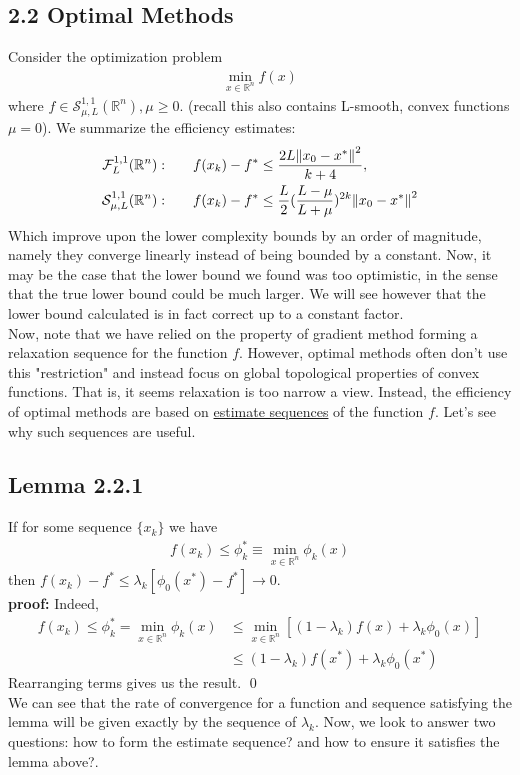 \documentclass[12pt,a4paper]{article}
\begin{document}
	 \subsection*{2.2 Optimal Methods}\label{sec22}
	 Consider the optimization problem
	 \begin{align*}
	 	\min_{x \in \mathbb{R}^n}f(x)
	 \end{align*}
	 where $f \in \mathcal{S}_{\mu, L}^{1,1}(\mathbb{R}^n), \mu \geq 0$. (recall this also contains L-smooth, convex functions $\mu=0$). We summarize the efficiency estimates:
	 \begin{align*}
	 	\mathcal{F}_L^{1,1}(\mathbb{R}^n): \hspace{20pt} &f(x_k) - f^* \leq \frac{2L\norm{x_0 - x^*}^2}{k+4}, \\
	 	\mathcal{S}_{\mu, L}^{1,1}(\mathbb{R}^n): \hspace{20pt} &f(x_k) - f^* \leq \frac{L}{2}(\frac{L-\mu}{L+\mu})^{2k}\norm{x_0 - x^*}^2
	 \end{align*}
	 Which improve upon the lower complexity bounds by an order of magnitude, namely they converge linearly instead of being bounded by a constant. Now, it may be the case that the lower bound we found was too optimistic, in the sense that the true lower bound could be much larger. We will see however that the lower bound calculated is in fact correct up to a constant factor. \\
	 Now, note that we have relied on the property of gradient method forming a relaxation sequence for the function $f$. However, optimal methods often don't use this "restriction" and instead focus on global topological properties of convex functions. That is, it seems relaxation is too narrow a view. Instead, the efficiency of optimal methods are based on \hyperref[sec:Def]{estimate sequences} of the function $f$. Let's see why such sequences are useful.
	 \subsection*{Lemma 2.2.1}\label{lem221}
	 If for some sequence $\{x_k\}$ we have
	 \begin{align*}
	 	f(x_k) \leq \phi_k^* \equiv \min_{x \in \mathbb{R}^n}\phi_k(x)
	 \end{align*}
	 then $f(x_k) - f^* \leq \lambda_k[\phi_0(x^*) - f^*] \rightarrow 0$. \\
	 \textbf{proof:} Indeed,
	 \begin{align*}
	 	f(x_k) \leq \phi_k^* = \min_{x \in \mathbb{R}^n}\phi_k(x) &\leq \min_{x \in \mathbb{R}^n}[(1 - \lambda_k)f(x) + \lambda_k\phi_0(x)]\\
	 	&\leq (1 - \lambda_k)f(x^*) + \lambda_k\phi_0(x^*)
	 \end{align*}
	 Rearranging terms gives us the result. \qed \\
	 We can see that the rate of convergence for a function and sequence satisfying the lemma will be given exactly by the sequence of $\lambda_k$. Now, we look to answer two questions: how to form the estimate sequence? and how to ensure it satisfies the lemma above?.\\
\end{document}

